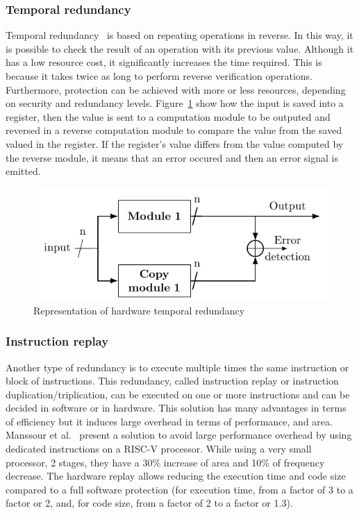 \subsubsection{Temporal redundancy}
Temporal redundancy~\cite{RBMK-10-host, MVL-07-fdtc, GK-13-tcad}  is based on repeating operations in reverse. In this way, it is possible to check the result of an operation with its previous value. Although it has a low resource cost, it significantly increases the time required. This is because it takes twice as long to perform reverse verification operations. Furthermore, protection can be achieved with more or less resources, depending on security and redundancy levels. Figure~\ref{fig:temporal_redundancy} show how the input is saved into a register, then the value is sent to a computation module to be outputed and reversed in a reverse computation module to compare the value from the saved valued in the register. If the register's value differs from the value computed by the reverse module, it means that an error occured and then an error signal is emitted.

\begin{figure}[ht]
    \centering
    \includegraphics[page=2]{c2_soa/img/redundancy.pdf}
    \caption{Representation of hardware temporal redundancy}
    \label{fig:temporal_redundancy}
\end{figure}

\subsubsection{Instruction replay}
Another type of redundancy is to execute multiple times the same instruction or block of instructions. This redundancy, called instruction replay or instruction duplication/triplication, can be executed on one or more instructions and can be decided in software or in hardware. This solution has many advantages in terms of efficiency but it induces large overhead in terms of performance, and area.
Manssour et al.~\cite{NLGT-22-ddecs} present a solution to avoid large performance overhead by using dedicated instructions on a RISC-V processor. While using a very small processor, 2 stages, they have a 30\% increase of area and 10\% of frequency decrease. The hardware replay allows reducing the execution time and code size compared to a full software protection (for execution time, from a factor of 3 to a factor or 2, and, for code size, from a factor of 2 to a factor or 1.3).

